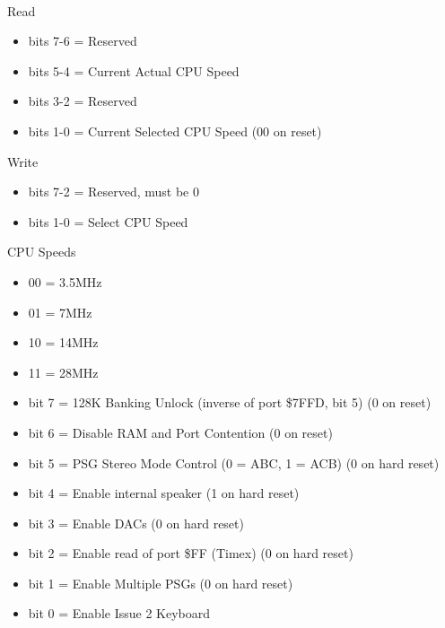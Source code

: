 \\
Read
\begin{itemize}
\item bits 7-6 = Reserved
\item bits 5-4 = Current Actual CPU Speed
\item bits 3-2 = Reserved
\item bits 1-0 = Current Selected CPU Speed (00 on reset)
\end{itemize}
Write
\begin{itemize}
\item bits 7-2 = Reserved, must be 0
\item bits 1-0 = Select CPU Speed
\end{itemize}
CPU Speeds
\begin{itemize}
\item 00 = 3.5MHz
\item 01 = 7MHz
\item 10 = 14MHz
\item 11 = 28MHz
\end{itemize}

\begin{itemize}
\item bit 7 = 128K Banking Unlock (inverse of port \$7FFD, bit 5) (0
  on reset)
\item bit 6 = Disable RAM and Port Contention (0 on reset)
\item bit 5 = PSG Stereo Mode Control (0 = ABC, 1 = ACB) (0 on hard
  reset)
\item bit 4 = Enable internal speaker (1 on hard reset)
\item bit 3 = Enable DACs (0 on hard reset)
\item bit 2 = Enable read of port \$FF (Timex) (0 on hard reset)
\item bit 1 = Enable Multiple PSGs (0 on hard reset)
\item bit 0 = Enable Issue 2 Keyboard
\end{itemize}

